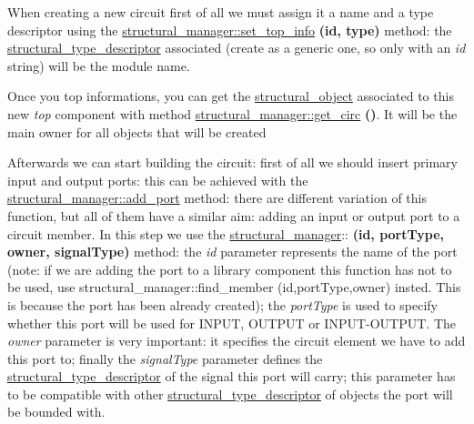 \begin{DoxyItemize}
\item When creating a new circuit first of all we must assign it a name and a type descriptor using the \hyperlink{classstructural__manager_a848a594d01b214d2b17deefdc127ca71}{structural\+\_\+manager\+::set\+\_\+top\+\_\+info} {\bfseries (id, type)} method\+: the \hyperlink{structstructural__type__descriptor}{structural\+\_\+type\+\_\+descriptor} associated (create as a generic one, so only with an {\itshape id} string) will be the module name.
\item Once you top informations, you can get the \hyperlink{classstructural__object}{structural\+\_\+object} associated to this new {\itshape top} component with method \hyperlink{classstructural__manager_a56ff3164d2a57d12312fa3c7bfceb244}{structural\+\_\+manager\+::get\+\_\+circ} {\bfseries ()}. It will be the main owner for all objects that will be created
\item Afterwards we can start building the circuit\+: first of all we should insert primary input and output ports\+: this can be achieved with the \hyperlink{classstructural__manager_a64e0c143cffd76072a1d5b885304a85a}{structural\+\_\+manager\+::add\+\_\+port} method\+: there are different variation of this function, but all of them have a similar aim\+: adding an input or output port to a circuit member. In this step we use the \hyperlink{classstructural__manager}{structural\+\_\+manager}\+:\+: {\bfseries (id, port\+Type, owner, signal\+Type)} method\+: the {\itshape id} parameter represents the name of the port (note\+: if we are adding the port to a library component this function has not to be used, use structural\+\_\+manager\+::find\+\_\+member (id,port\+Type,owner) insted. This is because the port has been already created); the {\itshape port\+Type} is used to specify whether this port will be used for I\+N\+P\+UT, O\+U\+T\+P\+UT or I\+N\+P\+U\+T-\/\+O\+U\+T\+P\+UT. The {\itshape owner} parameter is very important\+: it specifies the circuit element we have to add this port to; finally the {\itshape signal\+Type} parameter defines the \hyperlink{structstructural__type__descriptor}{structural\+\_\+type\+\_\+descriptor} of the signal this port will carry; this parameter has to be compatible with other \hyperlink{structstructural__type__descriptor}{structural\+\_\+type\+\_\+descriptor} of objects the port will be bounded with.

\end{DoxyItemize}
